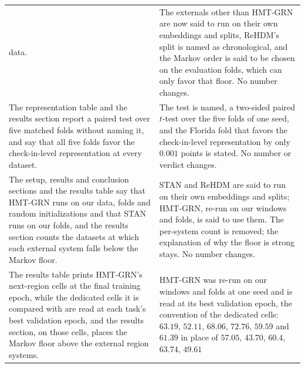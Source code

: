 \begin{table}[htb]
\begin{tabular}{@{}p{}p{}@{}}
data. &
The externals other than HMT-GRN are now said to run on their
own embeddings and splits, ReHDM's split is named as
chronological, and the Markov order is said to be chosen on the
evaluation folds, which can only favor that floor. No number
changes. \\
\addlinespace
The representation table and the results section report a
paired test over five matched folds without naming it, and say
that all five folds favor the check-in-level representation at
every dataset. &
The test is named, a two-sided paired $t$-test over the five
folds of one seed, and the Florida fold that favors the
check-in-level representation by only $0.001$ points is stated.
No number or verdict changes. \\
\addlinespace
The setup, results and conclusion sections and the results
table say that HMT-GRN runs on our data, folds and random
initializations and that STAN runs on our folds, and the
results section counts the datasets at which each external
system falls below the Markov floor. &
STAN and ReHDM are said to run on their own embeddings and
splits; HMT-GRN, re-run on our windows and folds, is said to
use them. The per-system count is removed; the explanation of
why the floor is strong stays. No number changes. \\
\addlinespace
The results table prints HMT-GRN's next-region cells at the
final training epoch, while the dedicated cells it is compared
with are read at each task's best validation epoch, and the
results section, on those cells, places the Markov floor above
the external region systems. &
HMT-GRN was re-run on our windows and folds at one seed and is
read at its best validation epoch, the convention of the
dedicated cells: $63.19$, $52.11$, $68.06$, $72.76$, $59.59$ and
$61.39$ in place of $57.05$, $43.70$, $60.4$, $63.74$, $49.61$

\end{tabular}
\end{table}
